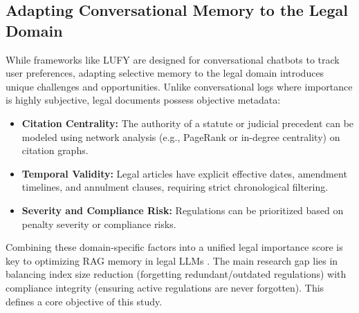 \subsection{Adapting Conversational Memory to the Legal Domain}
While frameworks like LUFY are designed for conversational chatbots to track user preferences, adapting selective memory to the legal domain introduces unique challenges and opportunities. Unlike conversational logs where importance is highly subjective, legal documents possess objective metadata:
\begin{itemize}
    \item \textbf{Citation Centrality:} The authority of a statute or judicial precedent can be modeled using network analysis (e.g., PageRank or in-degree centrality) on citation graphs.
    \item \textbf{Temporal Validity:} Legal articles have explicit effective dates, amendment timelines, and annulment clauses, requiring strict chronological filtering.
    \item \textbf{Severity and Compliance Risk:} Regulations can be prioritized based on penalty severity or compliance risks.
\end{itemize}
Combining these domain-specific factors into a unified legal importance score is key to optimizing RAG memory in legal LLMs \parencite{nguyen2025vlqacomprehensivelargehighquality}. The main research gap lies in balancing index size reduction (forgetting redundant/outdated regulations) with compliance integrity (ensuring active regulations are never forgotten). This defines a core objective of this study.
